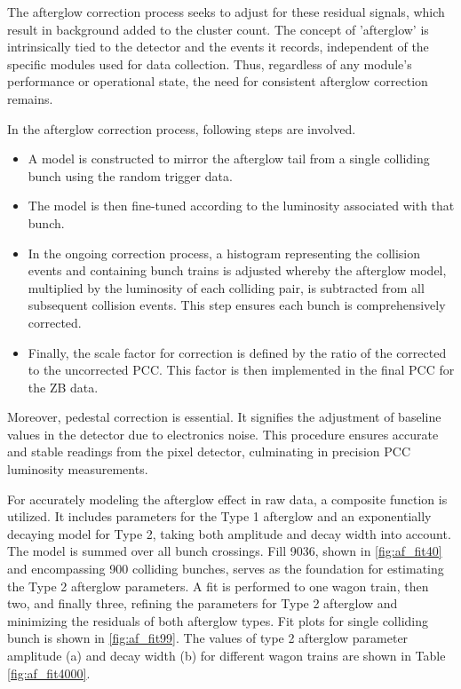 The afterglow correction process seeks to adjust for these residual signals, which result in background added to the cluster count. The concept of 'afterglow' is intrinsically tied to the detector and the events it records, independent of the specific modules used for data collection. Thus, regardless of any module's performance or operational state, the need for consistent afterglow correction remains.

In the afterglow correction process, following steps are involved.

\begin{itemize}
\item A model is constructed to mirror the afterglow tail from a single colliding bunch using the random trigger data.
\item The model is then fine-tuned according to the luminosity associated with that bunch.
\item In the ongoing correction process, a histogram representing the collision events and containing bunch trains is adjusted whereby the afterglow model, multiplied by the luminosity of each colliding pair, is subtracted from all subsequent collision events. This step ensures each bunch is comprehensively corrected.
\item Finally, the scale factor for correction is defined by the ratio of the corrected to the uncorrected PCC. This factor is then implemented in the final PCC for the ZB data. %
\end{itemize}

Moreover, pedestal correction is essential. It signifies the adjustment of baseline values in the detector due to electronics noise. This procedure ensures accurate and stable readings from the pixel detector, culminating in precision PCC luminosity measurements. %

For accurately modeling the afterglow effect in raw data, a composite function is utilized. It includes parameters for the Type 1 afterglow and an exponentially decaying model for Type 2, taking both amplitude and decay width into account. The model is summed over all bunch crossings. Fill 9036, shown in \ref{fig:af_fit40} and encompassing 900 colliding bunches, serves as the foundation for estimating the Type 2 afterglow parameters. A fit is performed to one wagon train, then two, and finally three, refining the parameters for Type 2 afterglow and minimizing the residuals of both afterglow types. Fit plots for single colliding bunch is shown in \ref{fig:af_fit99}. The values of type 2 afterglow parameter amplitude (a) and decay width (b) for different wagon trains are shown in Table \ref{fig:af_fit4000}. 
                                                                                                                                                                                  
